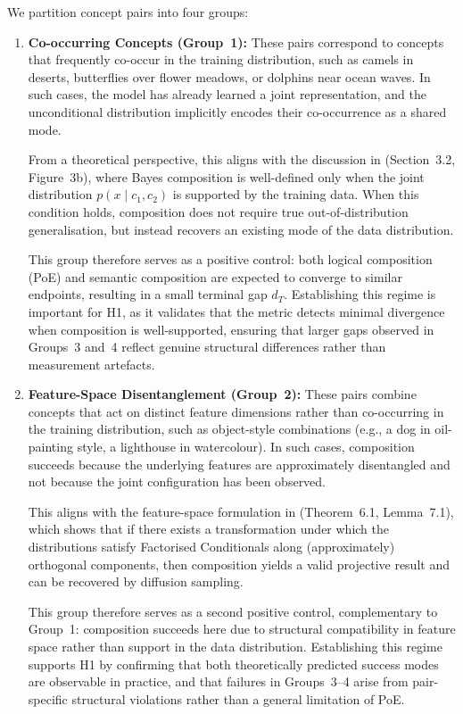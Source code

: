 We partition concept pairs into four groups:
\begin{enumerate}

    \item \textbf{Co-occurring Concepts (Group~1):}
    These pairs correspond to concepts that frequently co-occur in the training distribution, such as camels in deserts, butterflies over flower meadows, or dolphins near ocean waves.
    In such cases, the model has already learned a joint representation, and the unconditional distribution implicitly encodes their co-occurrence as a shared mode.

    From a theoretical perspective, this aligns with the discussion in \citet{mechanisms2025projective} (Section~3.2, Figure~3b), where Bayes composition is well-defined only when the joint distribution $p(x \mid c_1, c_2)$ is supported by the training data.
    When this condition holds, composition does not require true out-of-distribution generalisation, but instead recovers an existing mode of the data distribution.

    This group therefore serves as a positive control: both logical composition (PoE) and semantic composition are expected to converge to similar endpoints, resulting in a small terminal gap $d_T$.
    Establishing this regime is important for H1, as it validates that the metric detects minimal divergence when composition is well-supported, ensuring that larger gaps observed in Groups~3 and~4 reflect genuine structural differences rather than measurement artefacts.

    \item \textbf{Feature-Space Disentanglement (Group~2):}
    These pairs combine concepts that act on distinct feature dimensions rather than co-occurring in the training distribution, such as object-style combinations (e.g., a dog in oil-painting style, a lighthouse in watercolour).
    In such cases, composition succeeds because the underlying features are approximately disentangled and not because the joint configuration has been observed.

    This aligns with the feature-space formulation in \citet{mechanisms2025projective} (Theorem~6.1, Lemma~7.1), which shows that if there exists a transformation under which the distributions satisfy Factorised Conditionals along (approximately) orthogonal components, then composition yields a valid projective result and can be recovered by diffusion sampling.

    This group therefore serves as a second positive control, complementary to Group~1: composition succeeds here due to structural compatibility in feature space rather than support in the data distribution.
    Establishing this regime supports H1 by confirming that both theoretically predicted success modes are observable in practice, and that failures in Groups~3--4 arise from pair-specific structural violations rather than a general limitation of PoE.


\end{enumerate}
